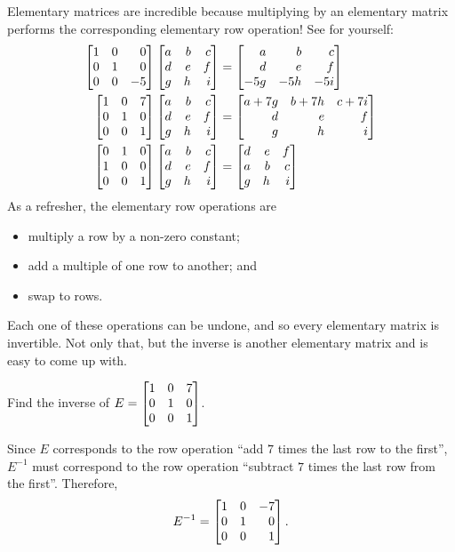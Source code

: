 Elementary matrices are incredible because multiplying by an elementary matrix performs the corresponding elementary row operation! See for
yourself:
\begin{align*}
	\mat{1&0&0\\0&1&0\\0&0&-5}
	\mat{a&b&c\\d&e&f\\g&h&i}
	&=
	\mat{a&b&c\\d&e&f\\-5g&-5h&-5i}
\\
	\mat{1&0&7\\0&1&0\\0&0&1}
	\mat{a&b&c\\d&e&f\\g&h&i}
	&=
	\mat{a+7g&b+7h&c+7i\\d&e&f\\g&h&i}
\\
	\mat{0&1&0\\1&0&0\\0&0&1}
	\mat{a&b&c\\d&e&f\\g&h&i}
	&=
	\mat{d&e&f\\a&b&c\\g&h&i}
\end{align*}
As a refresher, the elementary row operations are
\begin{itemize}
	\item multiply a row by a non-zero constant;
	\item add a multiple of one row to another; and
	\item swap to rows.
\end{itemize}
Each one of these operations can be undone, and so every elementary matrix is invertible. Not only that, but the inverse is
another elementary matrix and is
easy to come up with.

\begin{example}
	Find the inverse of $E=
	\mat{1&0&7\\0&1&0\\0&0&1}$.

	Since $E$ corresponds to the row operation ``add $7$ times the last row to the first'', $E^{-1}$ must correspond
	to the row operation ``subtract $7$ times the last row from the first''. Therefore,
	\[
		E^{-1}=\mat{1&0&-7\\0&1&0\\0&0&1}.
	\]
\end{example}

